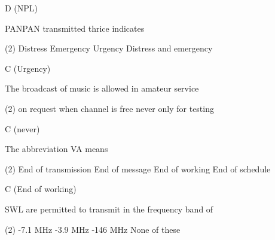 \documentclass[a4paper]{article}
\begin{document}
\begin{solution}
	D (NPL)
\end{solution}

\vspace{5mm}



\begin{question}PANPAN transmitted thrice indicates
	\begin{tasks}(2)
		\task Distress
		\task Emergency
		\task Urgency
		\task Distress and emergency
	\end{tasks}
\end{question}

\begin{solution}
	C (Urgency)
\end{solution}

\vspace{5mm}



\begin{question}The broadcast of music is allowed in amateur service
	\begin{tasks}(2)
		\task on request
		\task when channel is free
		\task never
		\task only for testing
	\end{tasks}
\end{question}

\begin{solution}
	C (never)
\end{solution}

\vspace{5mm}



\begin{question}The abbreviation VA means
	\begin{tasks}(2)
		\task End of transmission
		\task End of message
		\task End of working
		\task End of schedule
	\end{tasks}
\end{question}

\begin{solution}
	C (End of working)
\end{solution}

\vspace{5mm}



\begin{question}SWL are permitted to transmit in the frequency band of
	\begin{tasks}(2)
		-7.1 MHz
		-3.9 MHz
		-146 MHz
		\task None of these
	\end{tasks}
\end{question}
\end{document}

